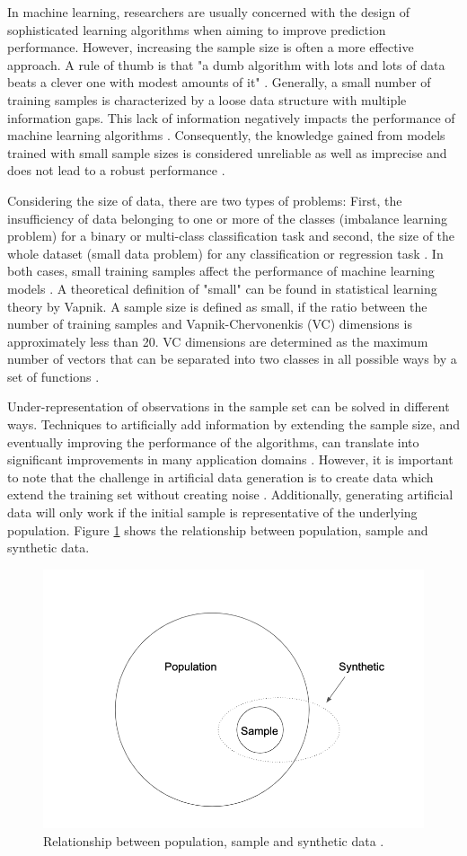 \documentclass[parskip=full]{scrartcl}
\begin{document}
In machine learning, researchers are usually concerned with the design of sophisticated learning algorithms when aiming to improve prediction performance. However, increasing the sample size is often a more effective approach. A rule of thumb is that "a dumb algorithm with lots and lots of data beats a clever one with modest amounts of it" \cite{Domingos.2012}. Generally, a small number of training samples is characterized by a loose data structure with multiple information gaps. This lack of information negatively impacts the performance of machine learning algorithms \cite{Lin.2018}. Consequently, the knowledge gained from models trained with small sample sizes is considered unreliable as well as imprecise and does not lead to a robust performance \cite{AbdulLateh.2017}.

Considering the size of data, there are two types of problems: First, the insufficiency of data belonging to one or more of the classes (imbalance learning problem) for a binary or multi-class classification task and second, the size of the whole dataset (small data problem) for any classification or regression task \cite{Sezer.2014}. In both cases, small training samples affect the performance of machine learning models \cite{Tsai.2008}. A theoretical definition of "small" can be found in statistical learning theory by Vapnik. A sample size is defined as small, if the ratio between the number of training samples and Vapnik-Chervonenkis (VC) dimensions is approximately less than 20. VC dimensions are determined as the maximum number of vectors that can be separated into two classes in all possible ways by a set of functions \cite{Vapnik.2008}.

Under-representation of observations in the sample set can be solved in different ways. Techniques to artificially add information by extending the sample size, and eventually improving the performance of the algorithms, can translate into significant improvements in many application domains \cite{Sezer.2014}. However, it is important to note that the challenge in artificial data generation is to create data which extend the training set without creating noise \cite{Li.2006}. Additionally, generating artificial data will only work if the initial sample is representative of the underlying population. Figure \ref{fig:relationship} shows the relationship between population, sample and synthetic data.

\begin{figure}[H]
	\centering
	\includegraphics[width=0.60\linewidth]{../analysis/relationship.png}
	\caption{Relationship between population, sample and synthetic data \cite{Li.2006}.}
	\label{fig:relationship}
\end{figure}
\end{document}
